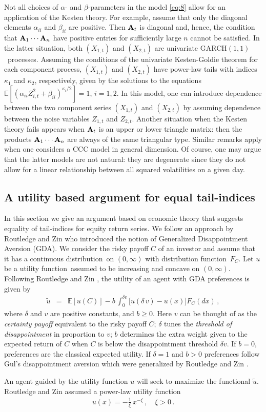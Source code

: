 \documentclass[11pt,a4]{amsart}
\newcommand{\garch}{{\rm GARCH}$(1,1)$}
\newcommand{\df}{distribution function}
\newcommand{\beao}{\begin{eqnarray*}}
\newcommand{\eeao}{\end{eqnarray*}\noindent}
\newcommand{\beam}{\begin{eqnarray}}
\newcommand{\eeam}{\end{eqnarray}\noindent}
\newcommand{\wt}{\widetilde}
\newcommand{\fct}{function}
\newcommand{\ds}{distribution}
\newcommand{\bfA}{{\bf A}}
\newcommand{\E }{{\mathbb E}}
\newcommand{\1}{{\mathbf 1}}
\begin{document}
Not all choices of $\alpha$- and $\beta$-parameters in the model \eqref{eq:8} allow for an
application of the Kesten theory. For example, assume that only the
diagonal elements $\alpha_{ii}$ and $\beta_{ii}$ are positive.
Then $\bfA_t$ is diagonal and, hence, the condition that
$\bfA_1\cdots\bfA_n$ have positive entries for sufficiently large $n$ 
cannot be satisfied. In the latter situation, both $(X_{1,t})$ and
$(X_{2,t})$ are univariate \garch\ processes. Assuming the 
conditions of the univariate Kesten-Goldie theorem for each component
process, $(X_{1,t})$ and $(X_{2,t})$ have power-law tails 
with indices $\kappa_1$ and $\kappa_2$, respectively,  given by the solutions to the equations 
$\E [(\alpha_{ii} Z_{i,t}^2+\beta_{ii})^{\kappa_i/2}]=1$, $i=1,2$. In
this model, one can introduce dependence between the two component
series $(X_{1,t})$ and $(X_{2,t})$ by assuming dependence between the
noise variables $Z_{1,t}$ and $Z_{2,t}$. Another situation when the
Kesten theory fails 
appears when $\bfA_t$ is an upper or lower triangle matrix: then the
products  $\bfA_1\cdots\bfA_n$ are always of the same triangular
type. 
Similar remarks apply when one considers a CCC model in general
dimension. Of course, one may argue that the latter models 
are not natural: they are degenerate since they do not allow 
for a linear relationship
between all squared volatilities on a given day. 

\subsection{A utility based argument for equal tail-indices}\label{sec:3}
In this section we give an argument based on economic theory that
suggests equality of  tail-indices for equity return series.
We follow an approach by Routledge and Zin
\cite{routledge2010generalized} who introduced the notion of
Generalized Disappointment Aversion (GDA). We consider the risky
payoff $C$ of an investor and assume that it has a continuous \ds\ on
$(0,\infty)$ with \df\ $F_C$. Let $u$ be a utility \fct\ assumed to be
increasing and concave on $(0,\infty)$.  Following Routledge and Zin
\cite{routledge2010generalized},
the utility of an agent with GDA preferences is given by
\beao%
  \wt u&=& \E [u(C)] - b\, \int_{0}^{\delta v}
  \big[ u(\delta \,v) - u(x) \big] F_C(dx)\,,
\eeao
where $\delta $ and $v$ are positive constants, and $b\ge 0$.
  Here $v$ can be thought of as the {\em certainty payoff} equivalent to the
 risky payoff $C$; $\delta$ tunes the {\em threshold of 
   disappointment} in proportion to $v$; $b$ determines the extra
 weight given to the expected return of $C$ when $C$ is below the
 disappointment threshold $\delta v$.
 If $b=0$, preferences are the classical expected utility. If
 $\delta=1$ and $b>0$ preferences follow Gul's \cite{gul:1991} 
disappointment aversion which were generalized by Routledge and Zin
\cite{routledge2010generalized}.
\par
An agent guided by the utility function $u$ will seek to maximize the
\fct al $\wt u$.
Routledge and Zin assumed a power-law utility function 
\beam\label{eq:hjyr}
u(x)=-\frac{1}{\xi}\,x^{-\xi}\,,\quad \xi>0\,. 
\eeam
\end{document}
